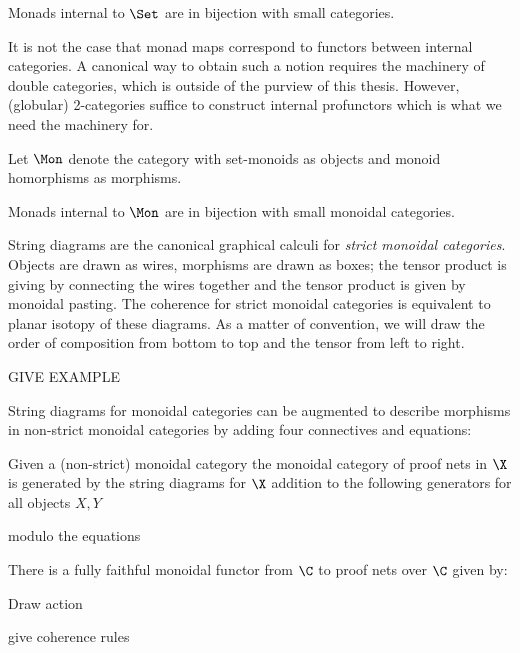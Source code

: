 \begin{lemma}
\label{lem:internalcat}

Monads internal to $\Set$ are in bijection with small categories.
\end{lemma}


It is not the case that monad maps correspond to functors between internal categories.  A canonical way to obtain such a notion requires the machinery of double categories, which is outside of the purview of this thesis.  However, (globular) 2-categories suffice to construct internal profunctors which is what we need the machinery for.




\begin{definition}
\label{def:monoid}
Let $\Mon$ denote the category with set-monoids as objects and monoid homorphisms as morphisms.
\end{definition}



\begin{lemma}
\label{def:internalmonoidalcat}

Monads internal to $\Mon$ are in bijection with small monoidal categories.
\end{lemma}

String diagrams are the canonical graphical calculi for {\em strict monoidal categories}. Objects are drawn as wires, morphisms are drawn as boxes; the tensor product is giving by connecting the wires together and the tensor product is given by monoidal pasting.  The coherence for strict monoidal categories is equivalent to planar isotopy of these diagrams. As a matter of convention, we will draw the order of composition from bottom to top and the tensor from left to right.


GIVE EXAMPLE

String diagrams for monoidal categories can be augmented to describe morphisms in non-strict monoidal categories by adding four connectives and equations:

\begin{definition}
Given a (non-strict) monoidal category the monoidal category of proof nets in $\X$ is generated by the string diagrams for $\X$ addition to the following generators for all objects $X,Y$

modulo the equations
\end{definition}


\begin{lemma}
There is a fully faithful monoidal functor from $\C$ to proof nets over $\C$ given by:

Draw action


give coherence rules
\end{lemma}

